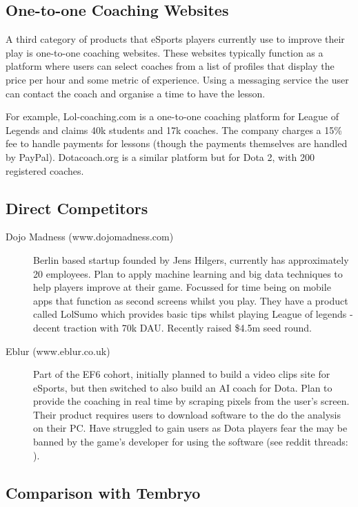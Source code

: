 \documentclass[12pt]{article} %
\begin{document}
\subsection{One-to-one Coaching Websites }
 
A third category of products that eSports players currently use to improve their play is one-to-one coaching websites. These websites typically function as a platform where users can select coaches from a list of profiles that display the price per hour and some metric of experience. Using a messaging service the user can contact the coach and organise a time to have the lesson.
 
For example, Lol-coaching.com is a one-to-one coaching platform for League of Legends and claims 40k students and 17k coaches. The company charges a 15\% fee to handle payments for lessons (though the payments themselves are handled by PayPal). Dotacoach.org is a similar platform but for Dota 2, with 200 registered coaches.

\subsection{Direct Competitors}

\begin{description}
 \item [Dojo Madness (www.dojomadness.com)] Berlin based startup founded by Jens Hilgers, currently has approximately 20 employees. Plan to apply machine learning and big data techniques to help players improve at their game. Focussed for time being on mobile apps that function as second screens whilst you play. They have a product called LolSumo which provides basic tips whilst playing League of legends - decent traction with 70k DAU. Recently raised \$4.5m seed round.

 \item [Eblur (www.eblur.co.uk)] Part of the EF6 cohort, initially planned to build a video clips site for eSports, but then switched to also build an AI coach for Dota. Plan to provide the coaching in real time by scraping pixels from the user's screen. Their product requires users to download software to the do the analysis on their PC. Have struggled to gain users as Dota players fear the may be banned by the game's developer for using the software (see reddit threads: \cite{Eblur}).
\end{description}

\pagebreak
\subsection{Comparison with Tembryo}
 
\end{document}
